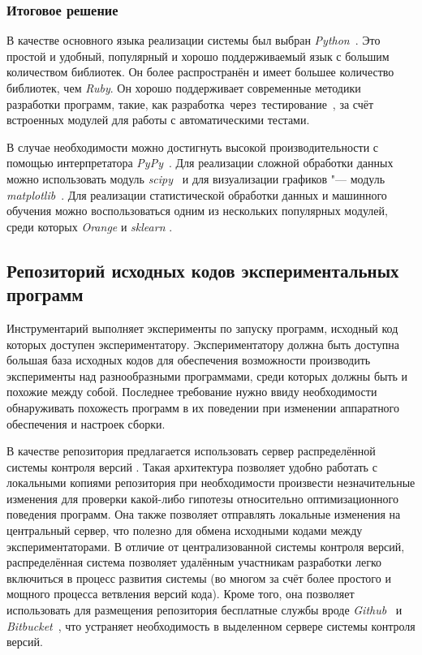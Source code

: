 \subsubsection{Итоговое решение}
В качестве основного языка реализации системы был выбран \textit{Python}~\cite{python}. Это простой и удобный, популярный и хорошо поддерживаемый язык с большим количеством библиотек. Он более распространён \cite{langpop} и имеет большее количество библиотек, чем \textit{Ruby}. Он хорошо поддерживает современные методики разработки программ, такие, как \mbox{разработка через тестирование \cite{tdd}}, за счёт встроенных модулей для работы с автоматическими тестами.

В случае необходимости можно достигнуть высокой производительности с помощью интерпретатора \textit{PyPy}~\cite{pypy}. Для реализации сложной обработки данных можно использовать модуль \textit{scipy}~\cite{scipy} и для визуализации графиков "--- модуль \textit{matplotlib}~\cite{matplotlib}. Для реализации статистической обработки данных и машинного обучения можно воспользоваться одним из нескольких популярных модулей, среди которых \textit{Orange} \cite{orange} и \textit{sklearn} \cite{sklearn}.


\subsection{Репозиторий исходных кодов экспериментальных программ}
Инструментарий выполняет эксперименты по запуску программ, исходный код которых доступен экспериментатору. Экспериментатору должна быть доступна большая база исходных кодов для обеспечения возможности производить эксперименты над разнообразными программами, среди которых должны быть и похожие между собой. Последнее требование нужно ввиду необходимости обнаруживать похожесть программ в их поведении при изменении аппаратного обеспечения и настроек сборки.

В качестве репозитория предлагается использовать сервер распределённой системы контроля версий \cite{distributed-vcs}. Такая архитектура позволяет удобно работать с локальными копиями репозитория при необходимости произвести незначительные изменения для проверки какой-либо гипотезы относительно оптимизационного поведения программ. Она также позволяет отправлять локальные изменения на центральный сервер, что полезно для обмена исходными кодами между экспериментаторами. В отличие от централизованной системы контроля версий, распределённая система позволяет удалённым участникам разработки легко включиться в процесс развития системы (во многом за счёт более простого и мощного процесса ветвления версий кода). Кроме того, она позволяет использовать для размещения репозитория бесплатные службы вроде \textit{Github}~\cite{github} и \textit{Bitbucket}~\cite{bitbucket}, что устраняет необходимость в выделенном сервере системы контроля версий.


